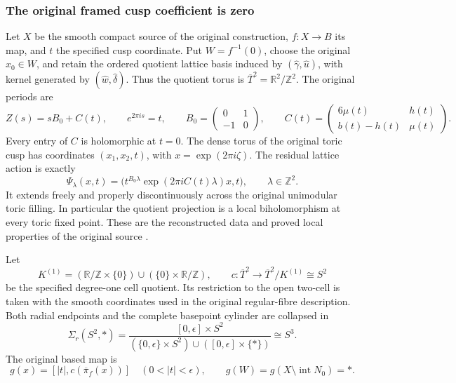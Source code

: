 \subsubsection{The original framed cusp coefficient is zero}
Let \(X\) be the smooth compact source of the original construction,
\(f:X\to B\) its map, and \(t\) the specified cusp coordinate.
Put \(W=f^{-1}(0)\), choose the original \(x_0\in W\), and retain the
ordered quotient lattice basis induced by
\((\widehat\gamma,\widehat u)\), with kernel generated by
\((\widehat w,\widehat\delta)\). Thus the quotient torus is
\(\overline T^2=\mathbb R^2/\mathbb Z^2\). The original periods are
\begin{equation}
 Z(s)=sB_0+C(t),\qquad e^{2\pi i s}=t,\qquad
 B_0=\begin{pmatrix}0&1\\-1&0\end{pmatrix},\qquad
 C(t)=\begin{pmatrix}6\mu(t)&h(t)\\b(t)-h(t)&\mu(t)\end{pmatrix}.
 \label{h24:gzero:eq:periods}
\end{equation}
Every entry of \(C\) is holomorphic at \(t=0\).
The dense torus of the original toric cusp has coordinates
\((x_1,x_2,t)\), with
\(x=\exp(2\pi i\zeta)\). The residual lattice action is exactly
\begin{equation}
 \Psi_\lambda(x,t)=
 \bigl(t^{B_0\lambda}\exp(2\pi iC(t)\lambda)x,t\bigr),
 \qquad\lambda\in\mathbb Z^2.
 \label{h24:gzero:eq:action}
\end{equation}
It extends freely and properly discontinuously across the original
unimodular toric filling. In particular the quotient projection is a local
biholomorphism at every toric fixed point. These are the reconstructed
data and proved local properties of the original source
\cite[\S4, source pp.~24--29]{h24:AlpogeS6_2026}.

Let
\[
 K^{(1)}=(\mathbb R/\mathbb Z\times\{0\})\cup(\{0\}\times\mathbb R/\mathbb Z),\qquad
 c:\overline T^2\longrightarrow \overline T^2/K^{(1)}\cong S^2
\]
be the specified degree-one cell quotient. Its restriction to the open
two-cell is taken with the smooth coordinates used in the original
regular-fibre description. Both radial endpoints and the complete
basepoint cylinder are collapsed in
\[
 \Sigma_r(S^2,*)=
 \frac{[0,\epsilon]\times S^2}
 {(\{0,\epsilon\}\times S^2)\cup([0,\epsilon]\times\{*\})}
 \cong S^3.
\]
The original based map is
\begin{equation}
 g(x)=[|t|,c(\overline\pi_f(x))]\quad(0<|t|<\epsilon),\qquad
 g(W)=g(X\setminus\operatorname{int}N_0)=*.
 \label{h24:gzero:eq:g}
\end{equation}


